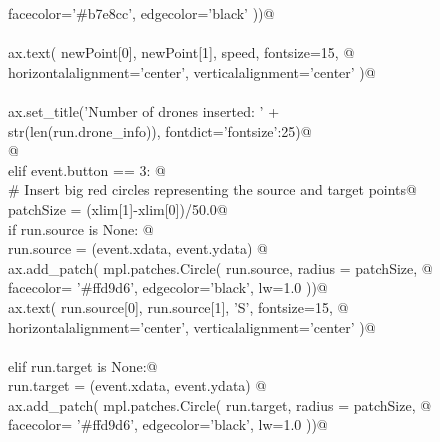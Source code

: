 \documentclass[10.0pt]{report}
\begin{document}
\begin{flushleft}
\begin{list}{}{}
\mbox{}\verb@                                                   facecolor='#b7e8cc', edgecolor='black'  ))@\\
\mbox{}\verb@@\\
\mbox{}\verb@                 ax.text( newPoint[0], newPoint[1], speed, fontsize=15, @\\
\mbox{}\verb@                          horizontalalignment='center', verticalalignment='center' )@\\
\mbox{}\verb@@\\
\mbox{}\verb@                 ax.set_title('Number of drones inserted: ' +\@\\
\mbox{}\verb@                              str(len(run.drone_info)), fontdict={'fontsize':25})@\\
\mbox{}\verb@                 @\\
\mbox{}\verb@             elif event.button == 3:  @\\
\mbox{}\verb@                 # Insert big red circles representing the source and target points@\\
\mbox{}\verb@                 patchSize  = (xlim[1]-xlim[0])/50.0@\\
\mbox{}\verb@                 if run.source is None:    @\\
\mbox{}\verb@                      run.source = (event.xdata, event.ydata)  @\\
\mbox{}\verb@                      ax.add_patch( mpl.patches.Circle( run.source, radius = patchSize, @\\
\mbox{}\verb@                                                        facecolor= '#ffd9d6', edgecolor='black', lw=1.0 ))@\\
\mbox{}\verb@                      ax.text( run.source[0], run.source[1], 'S', fontsize=15, @\\
\mbox{}\verb@                               horizontalalignment='center', verticalalignment='center' )@\\
\mbox{}\verb@@\\
\mbox{}\verb@                 elif run.target is None:@\\
\mbox{}\verb@                      run.target = (event.xdata, event.ydata)  @\\
\mbox{}\verb@                      ax.add_patch( mpl.patches.Circle( run.target, radius = patchSize, @\\
\mbox{}\verb@                                                       facecolor= '#ffd9d6', edgecolor='black', lw=1.0 ))@\\

\end{list}
\end{flushleft}
\end{document}
